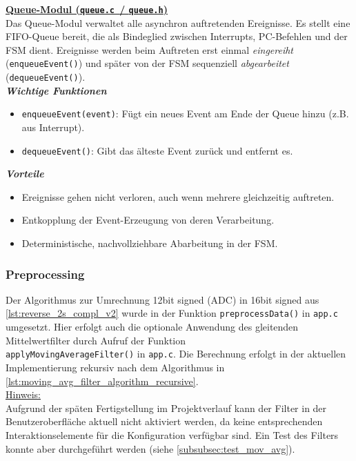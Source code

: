 \documentclass[a4paper, portrait, 12pt]{scrartcl} %
\begin{document}
\underline{\textbf{Queue-Modul (\texttt{queue.c }/ \texttt{queue.h})}}\\
Das Queue-Modul verwaltet alle asynchron auftretenden Ereignisse. 
Es stellt eine FIFO-Queue bereit, die als Bindeglied zwischen Interrupts, PC-Befehlen und der FSM dient. 
Ereignisse werden beim Auftreten erst einmal \emph{eingereiht} (\texttt{enqueueEvent()}) und später von der FSM sequenziell \emph{abgearbeitet} (\texttt{dequeueEvent()}).\\

\textbf{\emph{Wichtige Funktionen}}
\begin{itemize}
	\footnotesize
    \item \texttt{enqueueEvent(event)}: Fügt ein neues Event am Ende der Queue hinzu (z.B. aus Interrupt).
    \item \texttt{dequeueEvent()}: Gibt das älteste Event zurück und entfernt es.
\end{itemize}

\textbf{\emph{Vorteile}}
\begin{itemize}
	\footnotesize
    \item Ereignisse gehen nicht verloren, auch wenn mehrere gleichzeitig auftreten.
    \item Entkopplung der Event-Erzeugung von deren Verarbeitung.
    \item Deterministische, nachvollziehbare Abarbeitung in der FSM.
\end{itemize}

\subsubsection{Preprocessing}
Der Algorithmus zur Umrechnung 12bit signed (ADC) in 16bit signed aus \autoref{lst:reverse_2s_compl_v2} wurde in der Funktion \texttt{preprocessData()} in \texttt{app.c} umgesetzt. Hier erfolgt auch die optionale Anwendung des gleitenden Mittelwertfilter durch Aufruf der Funktion\\ \texttt{applyMovingAverageFilter()} in \texttt{app.c}. Die Berechnung erfolgt in der aktuellen Implementierung rekursiv nach dem Algorithmus in \autoref{lst:moving_avg_filter_algorithm_recursive}.\\

\underline{Hinweis:}\\
Aufgrund der späten Fertigstellung im Projektverlauf kann der Filter in der Benutzeroberfläche aktuell nicht aktiviert werden, da keine entsprechenden Interaktionselemente für die Konfiguration verfügbar sind. Ein Test des Filters konnte aber durchgeführt werden (siehe \autoref{subsubsec:test_mov_avg}).
\end{document}
